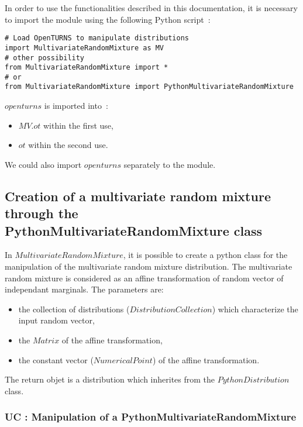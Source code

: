 In order to use the functionalities described in this documentation, it is necessary to import the module 
using the following Python script~:

\begin{lstlisting}
# Load OpenTURNS to manipulate distributions
import MultivariateRandomMixture as MV
# other possibility
from MultivariateRandomMixture import *
# or
from MultivariateRandomMixture import PythonMultivariateRandomMixture
\end{lstlisting}
$openturns$ is imported into~: 
\begin{itemize}
   \item $MV.ot$ within the first use,
   \item $ot$ within the second use.
\end{itemize}

We could also import $openturns$ separately to the module.


\subsection{Creation of a multivariate random mixture through the PythonMultivariateRandomMixture class} \label{MVRM}

In $MultivariateRandomMixture$, it is possible to create a python class for the manipulation of the multivariate random mixture distribution.
The multivariate random mixture is considered as an affine transformation of random vector of independant marginals. 
The parameters are:
\begin{itemize}
 \item the collection of distributions ($DistributionCollection$) which characterize the input random vector,
 \item the $Matrix$ of the affine transformation, 
 \item the constant vector ($NumericalPoint$) of the affine transformation.
\end{itemize}

The return objet is a distribution which inherites from the $PythonDistribution$ class.

\subsubsection{UC : Manipulation of a PythonMultivariateRandomMixture}
